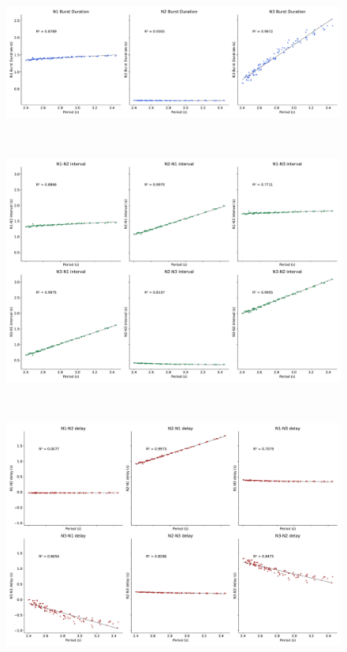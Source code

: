\begin{figure}[hbt!]
\begin{minipage}[b]{0.45\textwidth}
	\end{minipage}
	\begin{minipage}[b]{0.53\textwidth}
		\centering
		\begin{minipage}[b]{\textwidth}
			\centering
			\includegraphics[width=\textwidth]{invariants/data/MODEL/n3t_driven/images/3phases/_durations.pdf}
		\end{minipage}\
		\begin{minipage}[b]{\textwidth}
			\centering
			\includegraphics[width=\textwidth]{invariants/data/MODEL/n3t_driven/images/3phases/_intervals.pdf}
		\end{minipage}\
		\begin{minipage}[b]{\textwidth}
			\centering
			\includegraphics[width=\textwidth]{invariants/data/MODEL/n3t_driven/images/3phases/_delays.pdf}

\end{minipage}
\end{minipage}
\end{figure}
